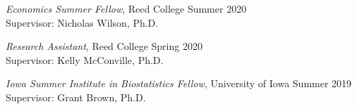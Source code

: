 \documentclass[margin]{res}
\begin{document}
\begin{resume}
\emph{Economics Summer Fellow}, Reed College \hfill Summer 2020 \\
Supervisor: Nicholas Wilson, Ph.D.

\emph{Research Assistant}, Reed College \hfill Spring 2020 \\
Supervisor: Kelly McConville, Ph.D.

\emph{Iowa Summer Institute in Biostatistics Fellow}, University of Iowa \hfill Summer 2019 \\
Supervisor: Grant Brown, Ph.D.


\end{resume} 
\end{document}
